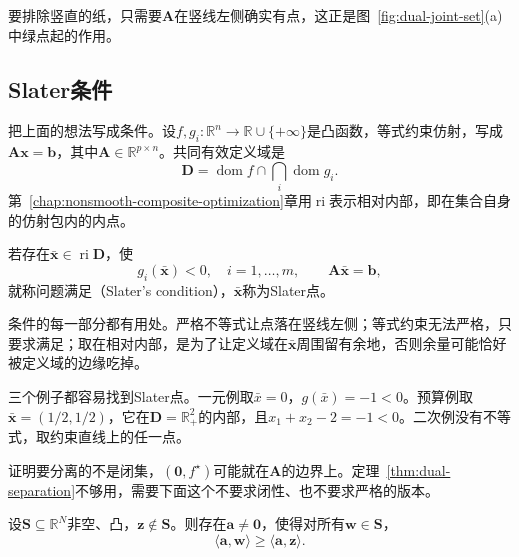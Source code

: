 要排除竖直的纸，只需要$\bm{A}$在竖线左侧确实有点，这正是图~\ref{fig:dual-joint-set}(a)中绿点起的作用。

\subsection{Slater条件}
\label{sec:dual-slater}

把上面的想法写成条件。设$f,g_i:\mathbb{R}^n\to\mathbb{R}\cup\{+\infty\}$是凸函数，等式约束仿射，写成$\bm{A}\bm{x}=\bm{b}$，其中$\bm{A}\in\mathbb{R}^{p\times n}$。共同有效定义域是
\[
 \bm{D}=\operatorname{dom}f\cap\bigcap_i\operatorname{dom}g_i.
\]
第~\ref{chap:nonsmooth-composite-optimization}章用$\operatorname{ri}$表示相对内部，即在集合自身的仿射包内的内点。

\begin{definition}[Slater条件]
 \label{def:dual-slater}
 若存在$\bar{\bm{x}}\in\operatorname{ri}\bm{D}$，使
 \begin{equation}
  g_i(\bar{\bm{x}})<0,\quad i=1,\ldots,m,\qquad\bm{A}\bar{\bm{x}}=\bm{b},
  \label{eq:dual-slater}
 \end{equation}
 就称问题满足（Slater's condition），$\bar{\bm{x}}$称为Slater点。
\end{definition}

条件的每一部分都有用处。严格不等式让点落在竖线左侧；等式约束无法严格，只要求满足；取在相对内部，是为了让定义域在$\bar{\bm{x}}$周围留有余地，否则余量可能恰好被定义域的边缘吃掉。

三个例子都容易找到Slater点。一元例取$\bar{x}=0$，$g(\bar{x})=-1<0$。预算例取$\bar{\bm{x}}=(1/2,1/2)$，它在$\bm{D}=\mathbb{R}^2_{+}$的内部，且$x_1+x_2-2=-1<0$。二次例没有不等式，取约束直线上的任一点。

证明要分离的不是闭集，$(\bm{0},f^\star)$可能就在$\bm{A}$的边界上。定理~\ref{thm:dual-separation}不够用，需要下面这个不要求闭性、也不要求严格的版本。

\begin{lemma}[点与凸集的分离]
 \label{lem:dual-separation-convex}
 设$\bm{S}\subseteq\mathbb{R}^N$非空、凸，$\bm{z}\notin\bm{S}$。则存在$\bm{a}\neq\bm{0}$，使得对所有$\bm{w}\in\bm{S}$，
 \begin{equation}
  \langle\bm{a},\bm{w}\rangle\geq\langle\bm{a},\bm{z}\rangle.
  \label{eq:dual-separation-convex}
 \end{equation}
\end{lemma}

